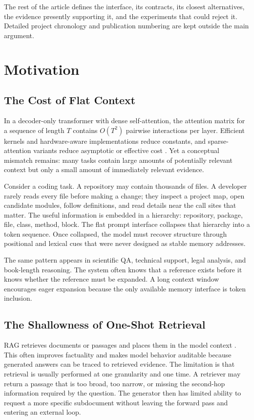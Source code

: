 \documentclass[11pt]{article}
\begin{document}
The rest of the article defines the interface, its contracts, its closest alternatives,
the evidence presently supporting it, and the experiments that could reject it.  Detailed
project chronology and publication numbering are kept outside the main argument.

\section{Motivation}

\subsection{The Cost of Flat Context}

In a decoder-only transformer with dense self-attention, the attention matrix for a sequence of length $T$ contains $O(T^2)$ pairwise interactions per layer. Efficient kernels and hardware-aware implementations reduce constants, and sparse-attention variants reduce asymptotic or effective cost \cite{beltagy2020longformer,zaheer2020bigbird,kitaev2020reformer,roy2021routing}. Yet a conceptual mismatch remains: many tasks contain large amounts of potentially relevant context but only a small amount of immediately relevant evidence.

Consider a coding task. A repository may contain thousands of files. A developer rarely reads every file before making a change; they inspect a project map, open candidate modules, follow definitions, and read details near the call sites that matter. The useful information is embedded in a hierarchy: repository, package, file, class, method, block. The flat prompt interface collapses that hierarchy into a token sequence. Once collapsed, the model must recover structure through positional and lexical cues that were never designed as stable memory addresses.

The same pattern appears in scientific QA, technical support, legal analysis, and book-length reasoning. The system often knows that a reference exists before it knows whether the reference must be expanded. A long context window encourages eager expansion because the only available memory interface is token inclusion.

\subsection{The Shallowness of One-Shot Retrieval}

RAG retrieves documents or passages and places them in the model context \cite{lewis2020rag}. This often improves factuality and makes model behavior auditable because generated answers can be traced to retrieved evidence. The limitation is that retrieval is usually performed at one granularity and one time. A retriever may return a passage that is too broad, too narrow, or missing the second-hop information required by the question. The generator then has limited ability to request a more specific subdocument without leaving the forward pass and entering an external loop.
\end{document}
